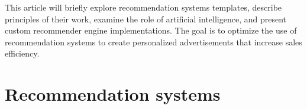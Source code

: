 \documentclass[10pt,twoside,english,a4paper]{article}
\begin{document}
\medskip This article will briefly explore recommendation systems templates, describe principles of their work, examine the role of artificial intelligence, and present custom recommender engine implementations. The goal is to optimize the use of recommendation systems to create personalized advertisements that increase sales efficiency.

\section{Recommendation systems}




% 
\end{document}
